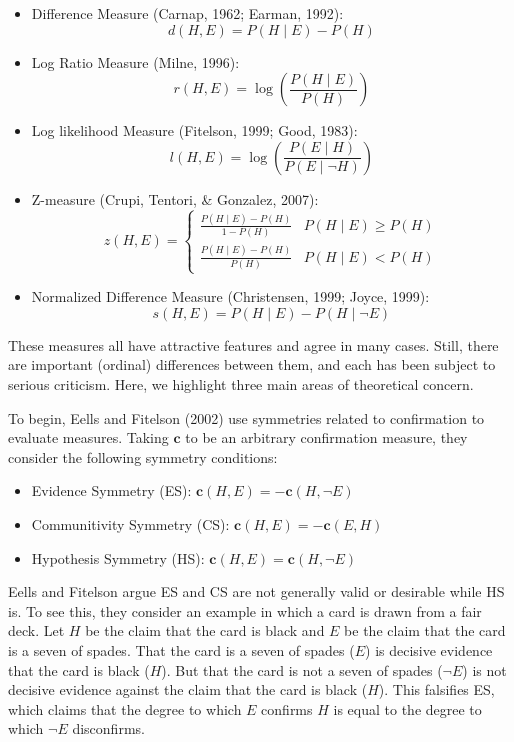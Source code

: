 \documentclass[10pt, letterpaper]{article}
\begin{document}
\begin{itemize}
\item
  Difference Measure (Carnap, 1962; Earman, 1992):
  \[d(H,E)=P(H \mid E)-P(H)\]
\item
  Log Ratio Measure (Milne, 1996):
  \[r(H,E)=\log\left(\frac{P(H \mid E)}{P(H)}\right)\]
\item
  Log likelihood Measure (Fitelson, 1999; Good, 1983):
  \[l(H,E)=\log\left(\frac{P(E \mid H)}{P(E \mid \neg H)}\right)\]
\item
  Z-measure (Crupi, Tentori, \& Gonzalez, 2007): \[
  z(H,E) = \begin{cases}
  \frac{P(H \mid E) - P(H)}{1-P(H)}  &  P(H \mid E) \geq P(H) \\
  \frac{P(H \mid E) - P(H)}{P(H)} & P(H \mid E) < P(H)
  \end{cases}
  \]
\item
  Normalized Difference Measure (Christensen, 1999; Joyce, 1999):
  \[s(H,E)=P(H \mid E)-P(H \mid \neg E)\]
\end{itemize}

These measures all have attractive features and agree in many cases.
Still, there are important (ordinal) differences between them, and each
has been subject to serious criticism. Here, we highlight three main
areas of theoretical concern.

To begin, Eells and Fitelson (2002) use symmetries related to
confirmation to evaluate measures. Taking \(\mathbf{c}\) to be an
arbitrary confirmation measure, they consider the following symmetry
conditions:

\begin{itemize}
\item
  Evidence Symmetry (ES): \(\mathbf{c}(H,E)=-\mathbf{c}(H, \neg E)\)
\item
  Communitivity Symmetry (CS): \(\mathbf{c}(H,E)=-\mathbf{c}(E, H)\)
\item
  Hypothesis Symmetry (HS): \(\mathbf{c}(H,E)= \mathbf{c}(H, \neg E)\)
\end{itemize}

Eells and Fitelson argue ES and CS are not generally valid or desirable
while HS is. To see this, they consider an example in which a card is
drawn from a fair deck. Let \(H\) be the claim that the card is black
and \(E\) be the claim that the card is a seven of spades. That the card
is a seven of spades (\(E\)) is decisive evidence that the card is black
(\(H\)). But that the card is not a seven of spades (\(\neg E\)) is not
decisive evidence against the claim that the card is black (\(H\)). This
falsifies ES, which claims that the degree to which \(E\) confirms \(H\)
is equal to the degree to which \(\neg E\) disconfirms.
\end{document}
